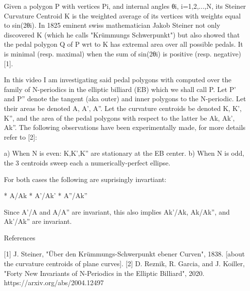 Given a polygon P with vertices Pi, and internal angles θi, i=1,2,...,N, its Steiner Curvature Centroid K is the weighted average of its vertices with weights equal to sin(2θi). In 1825 eminent swiss mathematician Jakob Steiner not only discovered K (which he calls "Krümmungs Schwerpunkt") but also showed that the pedal polygon Q of P wrt to K has extremal area over all possible pedals. It is minimal (resp. maximal) when the sum of sin(2θi) is positive (resp. negative) [1]. 

In this video I am investigating said pedal polygons with computed over the family of N-periodics in the elliptic billiard (EB) which we shall call P. Let P' and P'' denote the tangent (aka outer) and inner polygons to the N-periodic. Let their areas be denoted A, A', A''. Let the curvature centroids be denoted K, K', K'', and the area of the pedal polygons with respect to the latter be Ak, Ak', Ak''.  The following observations have been experimentally made, for more details refer to [2]:

a) When N is even: K,K',K'' are stationary at the EB center.
b) When N is odd, the 3 centroids sweep each a numerically-perfect ellipse.

For both cases the following are suprisingly invartiant:

* A/Ak
* A'/Ak'
* A''/Ak''

Since A'/A and A/A'' are invariant, this also implies Ak'/Ak, Ak/Ak'', and Ak'/Ak'' are invariant.

References

[1] J. Steiner, "Über den Krümmungs-Schwerpunkt ebener Curven", 1838. [about the curvature centroids of plane curves].
[2] D. Reznik, R. Garcia, and J. Koiller, "Forty New Invariants of N-Periodics in the Elliptic Billiard", 2020. https://arxiv.org/abs/2004.12497